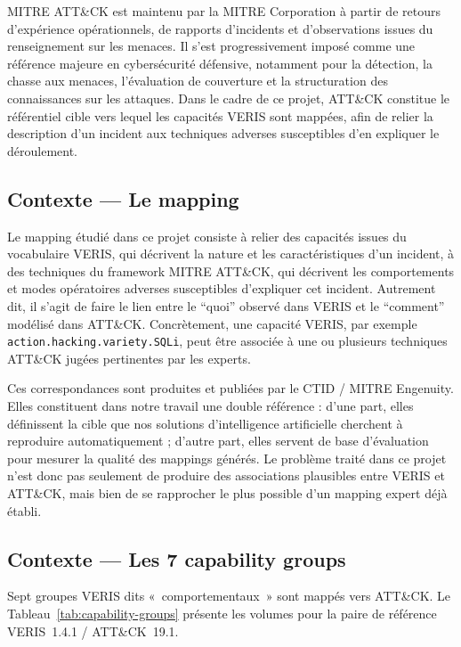 \documentclass[a4paper,12pt]{article}
\begin{document}
MITRE ATT\&CK est maintenu par la MITRE Corporation à partir de retours d'expérience opérationnels, de rapports d'incidents et d'observations issues du renseignement sur les menaces. Il s'est progressivement imposé comme une référence majeure en cybersécurité défensive, notamment pour la détection, la chasse aux menaces, l'évaluation de couverture et la structuration des connaissances sur les attaques. Dans le cadre de ce projet, ATT\&CK constitue le référentiel cible vers lequel les capacités VERIS sont mappées, afin de relier la description d'un incident aux techniques adverses susceptibles d'en expliquer le déroulement.

\subsection{Contexte --- Le mapping}

Le mapping étudié dans ce projet consiste à relier des capacités issues du vocabulaire VERIS, qui décrivent la nature et les caractéristiques d'un incident, à des techniques du framework MITRE ATT\&CK, qui décrivent les comportements et modes opératoires adverses susceptibles d'expliquer cet incident. Autrement dit, il s'agit de faire le lien entre le ``quoi'' observé dans VERIS et le ``comment'' modélisé dans ATT\&CK. Concrètement, une capacité VERIS, par exemple \texttt{action.hacking.variety.SQLi}, peut être associée à une ou plusieurs techniques ATT\&CK jugées pertinentes par les experts.

Ces correspondances sont produites et publiées par le CTID / MITRE Engenuity. Elles constituent dans notre travail une double référence : d'une part, elles définissent la cible que nos solutions d'intelligence artificielle cherchent à reproduire automatiquement ; d'autre part, elles servent de base d'évaluation pour mesurer la qualité des mappings générés. Le problème traité dans ce projet n'est donc pas seulement de produire des associations plausibles entre VERIS et ATT\&CK, mais bien de se rapprocher le plus possible d'un mapping expert déjà établi.

\subsection{Contexte --- Les 7 capability groups}

Sept groupes VERIS dits «~comportementaux~» sont mappés vers ATT\&CK. Le
Tableau~\ref{tab:capability-groups} présente les volumes pour la paire de référence
VERIS~1.4.1 / ATT\&CK~19.1.
\end{document}
